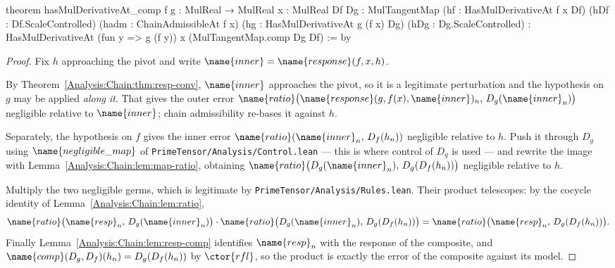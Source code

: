 \begin{leancode}
theorem hasMulDerivativeAt_comp
    {f g : MulReal → MulReal}
    {x : MulReal}
    {Df Dg : MulTangentMap}
    (hf : HasMulDerivativeAt f x Df)
    (hDf : Df.ScaleControlled)
    (hadm : ChainAdmissibleAt f x)
    (hg : HasMulDerivativeAt g (f x) Dg)
    (hDg : Dg.ScaleControlled) :
    HasMulDerivativeAt
      (fun y => g (f y))
      x
      (MulTangentMap.comp Dg Df) := by
\end{leancode}

\begin{proof}
Fix $h$ approaching the pivot and write $\name{inner} = \name{response}(f,x,h)$.

By Theorem~\ref{Analysis:Chain:thm:resp-conv}, $\name{inner}$ approaches the
pivot, so it is a legitimate perturbation and the hypothesis on $g$ may be
applied \emph{along it}.  That gives the outer error
$\name{ratio}\bigl(\name{response}(g,f(x),\name{inner})_n,\, D_g(\name{inner}_n)\bigr)$
negligible relative to $\name{inner}$; chain admissibility re-bases it against
$h$.

Separately, the hypothesis on $f$ gives the inner error
$\name{ratio}(\name{inner}_n,\, D_f(h_n))$ negligible relative to $h$.  Push it
through $D_g$ using $\name{negligible\_map}$ of
\texttt{PrimeTensor/Analysis/Control.lean} --- this is where control of $D_g$
is used --- and rewrite the image with
Lemma~\ref{Analysis:Chain:lem:map-ratio}, obtaining
$\name{ratio}\bigl(D_g(\name{inner}_n),\, D_g(D_f(h_n))\bigr)$ negligible
relative to $h$.

Multiply the two negligible germs, which is legitimate by
\texttt{PrimeTensor/Analysis/Rules.lean}.  Their product telescopes: by the
cocycle identity of Lemma~\ref{Analysis:Chain:lem:ratio},
\[
  \name{ratio}\bigl(\name{resp}_n,\, D_g(\name{inner}_n)\bigr) \cdot
  \name{ratio}\bigl(D_g(\name{inner}_n),\, D_g(D_f(h_n))\bigr)
  =
  \name{ratio}\bigl(\name{resp}_n,\, D_g(D_f(h_n))\bigr).
\]
Finally Lemma~\ref{Analysis:Chain:lem:resp-comp} identifies $\name{resp}_n$
with the response of the composite, and
$\name{comp}(D_g,D_f)(h_n) = D_g(D_f(h_n))$ by $\ctor{rfl}$, so the product is
exactly the error of the composite against its model.
\end{proof}

